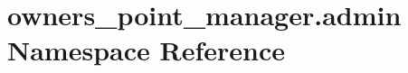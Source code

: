 \hypertarget{namespaceowners__point__manager_1_1admin}{\section{owners\-\_\-point\-\_\-manager.\-admin Namespace Reference}
\label{namespaceowners__point__manager_1_1admin}
}
